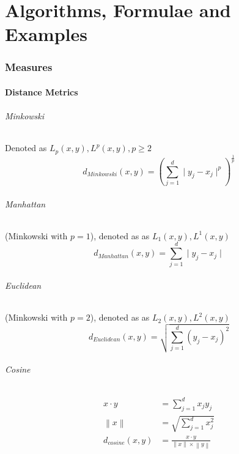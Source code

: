 \documentclass{article}
\begin{document}
    \newpage
    \part{Algorithms, Formulae and Examples}

        \section{Measures}
            \subsection{Distance Metrics}
                \paragraph{Minkowski} Denoted as $L_p(x, y), L^p(x, y), p \geq 2$
                    \begin{equation*}
                        d_{Minkowski}(x, y) = \left (\sum_{j=1}^d \mid y_j - x_j\mid^p \right)^{\frac{1}{p}}
                    \end{equation*}

                \paragraph{Manhattan} (Minkowski with $p=1$), denoted as as $L_1(x, y), L^1(x, y)$
                    \begin{equation*}
                        d_{Manhattan}(x,y) = \sum_{j=1}^d\mid y_j - x_j \mid
                    \end{equation*}

                \paragraph{Euclidean} (Minkowski with $p=2$), denoted as as $L_2(x, y), L^2(x, y)$
                    \begin{equation*}
                        d_{Euclidean}(x,y) = \sqrt{\sum_{j=1}^d(y_j - x_j)^2}
                    \end{equation*}

                \paragraph{Cosine}
                    \begin{align*}
                        x\cdot y &= \sum_{j=1}^d x_j y_j\\
                        \left \|x \right \| &= \sqrt{\sum_{j=1}^dx_j^2}\\
                        d_{cosine}(x,y) &= \frac{x\cdot y}{\left \|x \right \| \times \left \|y \right \|}
                    \end{align*}
\end{document}
